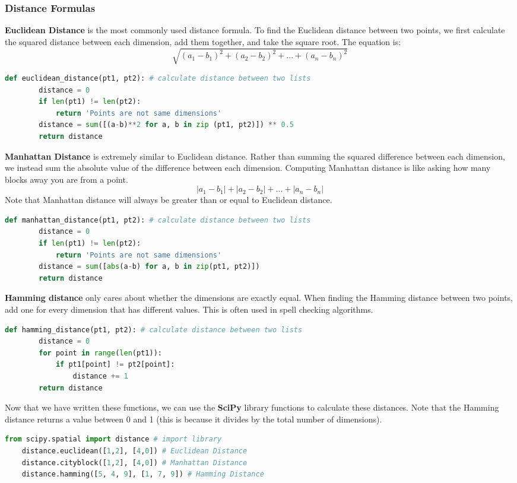 \documentclass[11pt, a4paper]{article}
\begin{document}
\begin{spacing}{1.1}
	\subsubsection{Distance Formulas}
	\textbf{Euclidean Distance} is the most commonly used distance formula. To find the Euclidean distance between two points, we first calculate the squared distance between each dimension, add them together, and take the square root. The equation is: $$ \sqrt{(a_1-b_1)^2 + (a_2-b_2)^2 + ... + (a_n-b_n)^2} $$
	\begin{lstlisting}[language=Python]
	def euclidean_distance(pt1, pt2): # calculate distance between two lists
		distance = 0
		if len(pt1) != len(pt2):
			return 'Points are not same dimensions'
		distance = sum([(a-b)**2 for a, b in zip (pt1, pt2)]) ** 0.5
		return distance	\end{lstlisting}\vspace*{2mm}
	\textbf{Manhattan Distance} is extremely similar to Euclidean distance. Rather than summing the squared difference between each dimension, we instead sum the absolute value of the difference between each dimension. Computing Manhattan distance is like asking how many blocks away you are from a point. $$ |a_1-b_1| + |a_2-b_2| + ... + |a_n-b_n| $$ Note that Manhattan distance will always be greater than or equal to Euclidean distance.
	\begin{lstlisting}[language=Python]
	def manhattan_distance(pt1, pt2): # calculate distance between two lists
		distance = 0
		if len(pt1) != len(pt2):
			return 'Points are not same dimensions'
		distance = sum([abs(a-b) for a, b in zip(pt1, pt2)])
		return distance\end{lstlisting}\vspace*{2mm}
	\textbf{Hamming distance} only cares about whether the dimensions are exactly equal. When finding the Hamming distance between two points, add one for every dimension that has different values. This is often used in spell checking algorithms. 
	\begin{lstlisting}[language=Python]
	def hamming_distance(pt1, pt2): # calculate distance between two lists
		distance = 0
		for point in range(len(pt1)):
			if pt1[point] != pt2[point]:
				distance += 1
		return distance\end{lstlisting}\vspace*{2mm}
	Now that we have written these functions, we can use the \textbf{SciPy} library functions to calculate these distances. Note that the Hamming distance returns a value between 0 and 1 (this is because it divides by the total number of dimensions).
	\begin{lstlisting}[language=Python]
	from scipy.spatial import distance # import library
	distance.euclidean([1,2], [4,0]) # Euclidean Distance
	distance.cityblock([1,2], [4,0]) # Manhattan Distance
	distance.hamming([5, 4, 9], [1, 7, 9]) # Hamming Distance \end{lstlisting} \newpage

\end{spacing}
\end{document}
